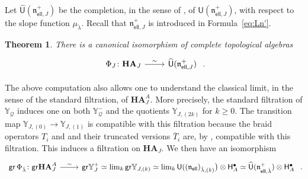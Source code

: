 \documentclass[reqno,a4paper]{amsart}
\newcommand{\Y}{\mathbb{Y}}
\newcommand{\sfU}{\mathsf{U}}
\newcommand{\sff}{\mathsf{f}}
\newcommand{\bfX}{\mathbf{X}}
\newcommand{\qv}{\mathcal{Q}}
\newcommand{\Llambda}{{\check{\lambda}}}
\newcommand{\weightlattice}{\bfX}
\newcommand{\coweightlattice}{\check{\weightlattice}}
\newcommand{\coweightlatticefin}{\coweightlattice_\sff}
\newcommand{\fraknell}{\mathfrak{n}_{\mathsf{ell}}}
\newcommand{\fraknellLlambda}{\mathfrak{n}_{\mathsf{ell}, \Llambda}}
\newcommand{\fraknellJ}{\mathfrak{n}_{\mathsf{ell}, J}}
\newcommand{\gr}{\mathsf{gr}}
\newcommand{\Hbullet}{\mathsf{H}^\bullet}
\newcommand{\coha}{\mathbf{HA}}
\theoremstyle{basic-theorem}
\newtheorem{theorem}{Theorem}[section]
\numberwithin{equation}{section}
\begin{document}
Let $\widehat{\sfU}(\fraknellJ^+)$ be the completion, in the sense of \cite[Lemma~\ref*{COHA-Yangian-lem:completion-graded-Lie-algebra}]{DPSSV-3}, of $\sfU(\fraknellJ^+)$, with respect to the slope function $\mu_{\Llambda}$. Recall that $\fraknellJ^+$ is introduced in Formula~\eqref{eq:Ln'}.
\begin{theorem}\label{thm:coha-surface-as-limit3}
	There is a canonical isomorphism of complete topological algebras
	\begin{align}
		\begin{tikzcd}[ampersand replacement=\&]
			\Phi_J\colon\coha_J \ar{r}{\sim}\& \widehat{\sfU}(\fraknellJ^+)
		\end{tikzcd}\ .
	\end{align}
\end{theorem}

\begin{remark}
	The above computation also allows one to understand the classical limit, in the sense of the standard filtration, of $\coha_J^A$. More precisely, the standard filtration of $\Y_\qv$ induces one on both $\Y^-_\qv$ and the quotients $\Y_{J, (2k)}$ for $k \geq 0$. The transition map $\Y_{J, (0)} \to \Y_{J, (1)}$ is compatible with this filtration because the braid operators $T_i$ and and their truncated versions $\overline{T}_i$ are, by \cite[Formula~(\ref*{COHA-Yangian-eq:Ti})]{DPSSV-3}, compatible with this filtration. This induces 
	a filtration on $\coha_J$. We then have an isomorphism
	\begin{align}
		\begin{tikzcd}[ampersand replacement=\&]
			\gr\, \Phi_{\Llambda}\colon\gr\coha_J^A  \ar{r}{\sim}\& \gr \Y_J^+\simeq \lim_k\gr \Y_{J, (k)} \simeq \lim_k \sfU((\fraknell)_{\Llambda,(k)}\big)\otimes \Hbullet_A \simeq \widehat{\sfU}(\fraknellLlambda^+)\otimes \Hbullet_A
		\end{tikzcd}\ .
	\end{align}
\end{remark}

\bigskip


%
%
\end{document}
